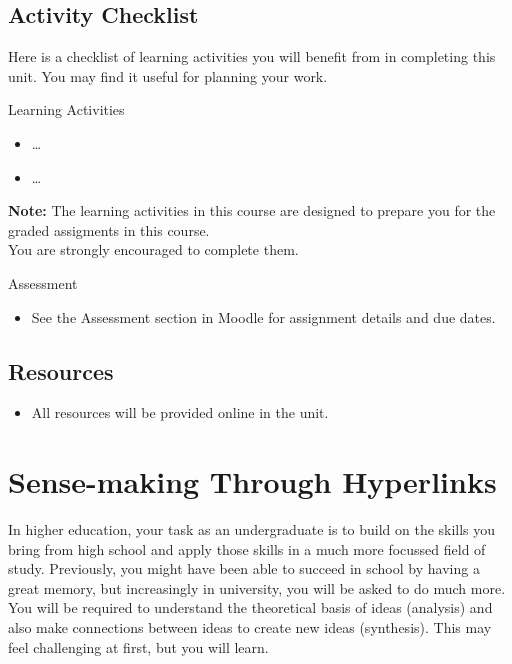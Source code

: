 \documentclass[
]{book}
\providecommand{\tightlist}{%
  \setlength{\itemsep}{0pt}\setlength{\parskip}{0pt}}
\theoremstyle{definition}
\theoremstyle{definition}
\theoremstyle{definition}
\theoremstyle{definition}
\theoremstyle{remark}
\begin{document}
\hypertarget{activity-checklist-2}{%
\subsection*{Activity Checklist}\label{activity-checklist-2}}

Here is a checklist of learning activities you will benefit from in completing this unit. You may find it useful for planning your work.

\begin{reflect}
{Learning Activities}

\begin{itemize}
\tightlist
\item
  \ldots{}
\item
  \ldots{}
\end{itemize}

\textbf{Note:} The learning activities in this course are designed to prepare you for the graded assigments in this course.\\
You are strongly encouraged to complete them.
\end{reflect}

\begin{assessment}
{Assessment}

\begin{itemize}
\tightlist
\item
  See the Assessment section in Moodle for assignment details and due dates.
\end{itemize}
\end{assessment}

\hypertarget{resources-2}{%
\subsection*{Resources}\label{resources-2}}

\begin{itemize}
\tightlist
\item
  All resources will be provided online in the unit.
\end{itemize}

\hypertarget{sense-making-through-hyperlinks}{%
\section{Sense-making Through Hyperlinks}\label{sense-making-through-hyperlinks}}

In higher education, your task as an undergraduate is to build on the skills you bring from high school and apply those skills in a much more focussed field of study. Previously, you might have been able to succeed in school by having a great memory, but increasingly in university, you will be asked to do much more. You will be required to understand the theoretical basis of ideas (analysis) and also make connections between ideas to create new ideas (synthesis). This may feel challenging at first, but you will learn.
\end{document}
